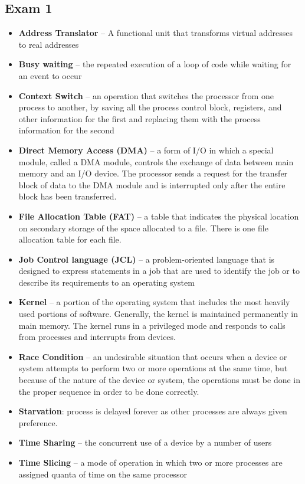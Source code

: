 \documentclass[fontsize=5pt]{scrartcl}
\begin{document}
\begin{multicols}{3}
    \subsection{Exam 1}
      \begin{itemize}
        \item \textbf{Address Translator} – A functional unit that transforms virtual addresses to real addresses
        \item \textbf{Busy waiting} – the repeated execution of a loop of code while waiting for an event to occur
        \item \textbf{Context Switch} – an operation that switches the processor from one process to another, by saving all the process control block, registers, and other information for the first and 
                                        replacing them with the process information for the second
        \item \textbf{Direct Memory Access (DMA)} – a form of I/O in which a special module, called a DMA module, controls the exchange of data between main memory and an I/O device.  
                                    The processor sends a request for the transfer block of data to the DMA module and is interrupted only after the entire block has been transferred.
        \item \textbf{File Allocation Table (FAT)} – a table that indicates the physical location on secondary storage of the space allocated to a file.  There is one file allocation table for each file.
        \item \textbf{Job Control language (JCL)} – a problem-oriented language that is designed to express statements in a job that are used to identify the job or to describe its requirements to an operating system
        \item \textbf{Kernel} – a portion of the operating system that includes the most heavily used portions of software.  Generally, the kernel is maintained permanently in main memory.  
                The kernel runs in a privileged mode and responds to calls from processes and interrupts from devices.
        \item \textbf{Race Condition} – an undesirable situation that occurs when a device or system attempts to perform two or more operations at the same time, but because of the nature of the device or system, 
        the operations must be done in the proper sequence in order to be done correctly.
        \item \textbf{Starvation}: process is delayed forever as other processes are always given preference.
        \item \textbf{Time Sharing} – the concurrent use of a device by a number of users
        \item \textbf{Time Slicing} – a mode of operation in which two or more processes are assigned quanta of time on the same processor
      \end{itemize}

\end{multicols}
\end{document}
